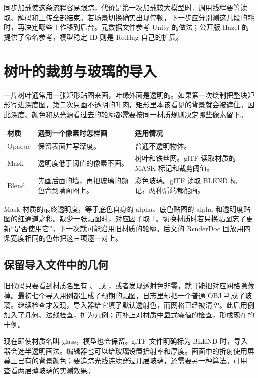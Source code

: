 同步加载使这条流程容易跟踪，代价是第一次加载较大模型时，调用线程要等读取、解码和上传全部结束。若场景切换确实出现停顿，下一步应分别测这几段的耗时，再决定哪些工作移到后台。元数据文件参考 Unity 的做法；公开版 Hazel 的  提供了命名参考，模型稳定 ID 则是 Redflag 自己的扩展。

\newpage
\section{树叶的裁剪与玻璃的导入}
一片树叶通常用一张矩形贴图来画，叶缘外面是透明的。如果第一次绘制把整块矩形写进深度图，第二次只画不透明的叶肉，矩形里本该看见的背景就会被遮住。因此深度、颜色和从光源看过去的轮廓都需要按同一材质规则决定哪些像素留下。
\begin{tabularx}{\textwidth}{L{2.2cm}YY}
\toprule
材质 & 遇到一个像素时怎样画 & 适用情况 \\
\midrule
Opaque & 保留表面并写深度。 & 普通不透明物体。 \\
Mask & 透明度低于阈值的像素不画。 & 树叶和铁丝网。glTF 读取材质的 MASK 标记和裁剪阈值。 \\
Blend & 先画后面的墙，再把玻璃的颜色合到墙面图上。 & 彩色玻璃。glTF 读取 BLEND 标记，两种后端都能画。 \\
\bottomrule
\end{tabularx}

Mask 材质的最终透明度，等于底色自身的 alpha、底色贴图的 alpha 和透明度贴图的红通道之积。缺少一张贴图时，对应因子取 1。切换材质时若只换贴图忘了更新“是否使用它”，下一次就可能沿用旧材质的轮廓。后文的 RenderDoc 回放用四条宽度相同的色带把这三项逐一对上。

\subsection{保留导入文件中的几何}
旧代码只要看到材质名里有 、 或 ，或者发现透射色非零，就可能把对应网格隐藏掉。最初七个导入用例都生成了预期的贴图，日志里却把一个普通 OBJ 判成了玻璃。继续检查才发现，导入器给它填了默认透射色，而网格已经被清空。此后用例加入了几何、法线检查，扩为九例；再补上对材质中显式零值的检查，形成现在的十例。

现在即使材质名叫 glass，模型也会保留。glTF 文件明确标为 BLEND 时，导入器会选半透明画法。编辑器也可以给玻璃设置折射率和厚度。画面中的折射使用屏幕上已有的背景颜色；要追踪光线连续穿过几层玻璃，还需要另一种算法。可用  查看两层薄玻璃的实测效果。

